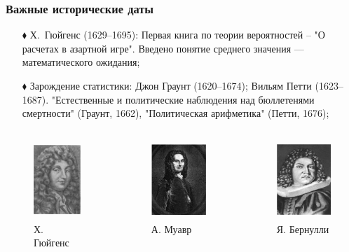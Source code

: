 \documentclass[fullscreen=true]{beamer}
\begin{document}

\begin{frame}
\frametitle{Важные исторические даты}
\begin{itemize}
\item[$\blacklozenge$] Х.~Гюйгенс (1629--1695): Первая книга по
теории вероятностей -- "О расчетах в азартной игре".  Введено
понятие среднего значения --- математического ожидания;
\item[$\blacklozenge$] Зарождение статистики: Джон Граунт
(1620--1674); Вильям Петти (1623--1687). "Естественные и
политические наблюдения над бюллетенями смертности" (Граунт, 1662),
"Политическая арифметика" (Петти, 1676);
\end{itemize}
\begin{columns}
\begin{column}{4cm}
\begin{figure}
\includegraphics[height=3cm]{gugens}
\caption{Х. Гюйгенс}
\end{figure}
\end{column}
\begin{column}{4cm}
\begin{figure}
\includegraphics[height=3cm]{moivre}
\caption{А. Муавр}
\end{figure}
\end{column}
\begin{column}{4cm}
\begin{figure}
\includegraphics[height=3cm]{bernulli}
\caption{Я. Бернулли}
\end{figure}
\end{column}
\end{columns}
\end{frame}
\end{document}
